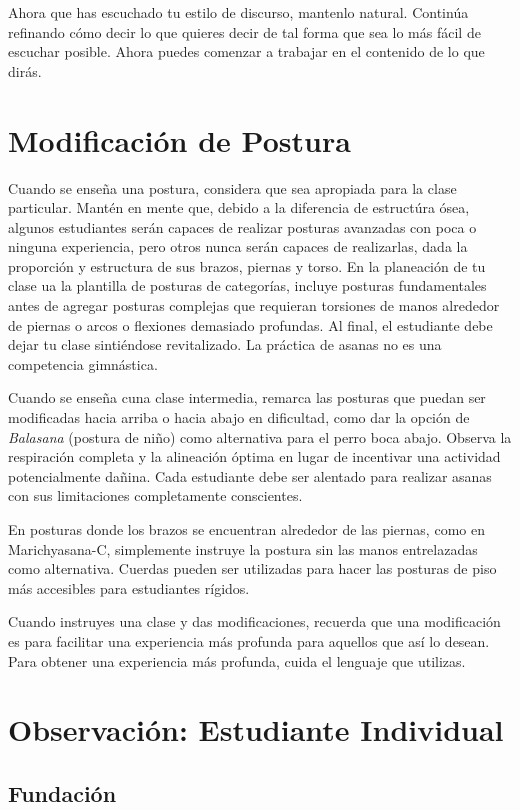 Ahora que has escuchado tu estilo de discurso, mantenlo natural. Continúa refinando cómo decir lo que quieres decir de tal forma que sea lo más fácil de escuchar posible. Ahora puedes comenzar a trabajar en el contenido de lo que dirás.

\section{Modificación de Postura}
Cuando se enseña una postura, considera que sea apropiada para la clase particular. Mant\'en en mente que, debido a la diferencia de estructúra ósea, algunos estudiantes serán capaces de realizar posturas avanzadas con poca o ninguna experiencia, pero otros nunca serán capaces de realizarlas, dada la proporción y estructura de sus brazos, piernas y torso. En la planeación de tu clase ua la plantilla de posturas de categorías, incluye posturas fundamentales antes de agregar posturas complejas que requieran torsiones de manos alrededor de piernas o arcos o flexiones demasiado profundas. Al final, el estudiante debe dejar tu clase sinti\'endose revitalizado. La práctica de asanas no es una competencia gimnástica.

Cuando se enseña cuna clase intermedia, remarca las posturas que puedan ser modificadas hacia arriba o hacia abajo en dificultad, como dar la opción de \textit{Balasana} (postura de niño) como alternativa para el perro boca abajo. Observa la respiración completa y la alineación óptima en lugar de incentivar una actividad potencialmente dañina. Cada estudiante debe ser alentado para realizar asanas con sus limitaciones completamente conscientes.

En posturas donde los brazos se encuentran alrededor de las piernas, como en Marichyasana-C, simplemente instruye la postura sin las manos entrelazadas como alternativa. Cuerdas pueden ser utilizadas para hacer las posturas de piso más accesibles para estudiantes rígidos.

Cuando instruyes una clase y das modificaciones, recuerda que una modificación es para facilitar una experiencia más profunda para aquellos que así lo desean. Para obtener una experiencia más profunda, cuida el lenguaje que utilizas.


\section{Observación: Estudiante Individual}
\subsection{Fundación}
